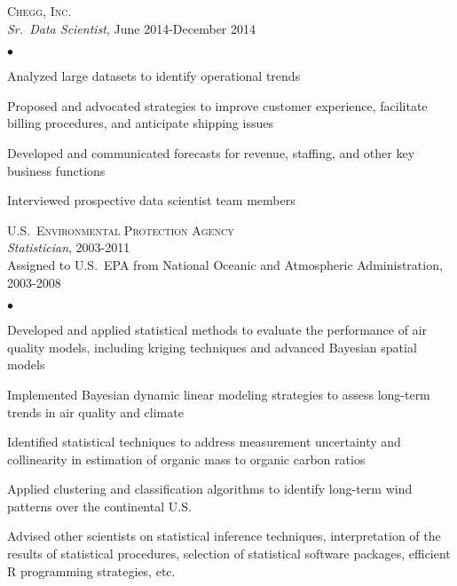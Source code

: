 \documentclass[11pt]{article}
\def\newempl{\vspace*{0.5cm}}
\begin{document}
\newempl
\textsc{Chegg, Inc.}\\  %
\textit{Sr.\ Data Scientist}, June 2014-December 2014

\begin{list}{$\bullet$}{
\setlength{\topsep}{0cm}
\setlength{\partopsep}{0cm}
\setlength{\parsep}{0cm}
\setlength{\itemsep}{0cm}
\setlength{\labelsep}{1ex}
\setlength{\labelwidth}{1em}
\setlength{\leftmargin}{1em}
}
\item Analyzed large datasets to identify operational trends %
\item Proposed and advocated strategies to improve customer experience, facilitate billing procedures, and anticipate shipping issues
\item Developed and communicated forecasts for revenue, staffing, and other key business functions
\item Interviewed prospective data scientist team members
\end{list}



\newempl
\textsc{U.S.\ Environmental Protection Agency}\\ %
\textit{Statistician}, 2003-2011\\
Assigned to U.S.~EPA from National Oceanic and Atmospheric Administration,
2003-2008

\begin{list}{$\bullet$}{
\setlength{\topsep}{0cm}
\setlength{\partopsep}{0cm}
\setlength{\parsep}{0cm}
\setlength{\itemsep}{0cm}
\setlength{\labelsep}{1ex}
\setlength{\labelwidth}{1em}
\setlength{\leftmargin}{1em}
}
\item Developed and applied statistical methods to evaluate the performance of air quality models, including kriging techniques and advanced Bayesian spatial models
\item Implemented Bayesian dynamic linear modeling strategies to assess long-term trends in air quality and climate
\item Identified statistical techniques to address measurement uncertainty and collinearity in estimation of organic mass to organic carbon ratios
\item Applied clustering and classification algorithms to identify long-term wind patterns over the continental U.S.
\item Advised other scientists on statistical inference techniques,
  interpretation of the results of statistical procedures, selection
  of statistical software packages, efficient R programming strategies, etc.
\end{list}
\end{document}
